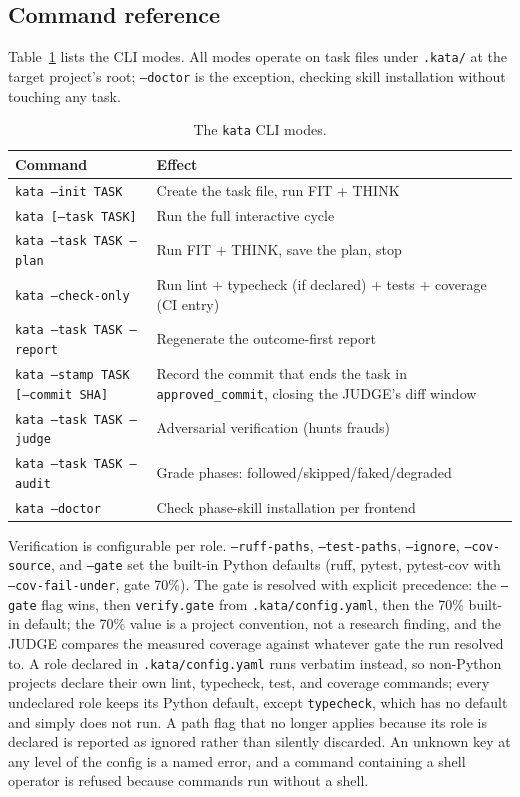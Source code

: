 \documentclass{sbc2019}%
\begin{document}
\subsection{Command reference}

Table~\ref{tab:cli} lists the CLI modes. All modes operate on task files
under \texttt{.kata/} at the target project's root; \texttt{--doctor} is
the exception, checking skill installation without touching any task.

\begin{table}[!ht]
\caption{The \texttt{kata} CLI modes.}
\centering
\begin{tabular}{@{}ll@{}}
\hline\hline
Command & Effect \\
\hline
\texttt{kata --init TASK} & Create the task file, run FIT + THINK \\
\texttt{kata [--task TASK]} & Run the full interactive cycle \\
\texttt{kata --task TASK --plan} & Run FIT + THINK, save the plan, stop \\
\texttt{kata --check-only} & Run lint + typecheck (if declared) + tests + coverage (CI entry) \\
\texttt{kata --task TASK --report} & Regenerate the outcome-first report \\
\texttt{kata --stamp TASK [--commit SHA]} & Record the commit that ends the task in \texttt{approved\_commit}, closing the JUDGE's diff window \\
\texttt{kata --task TASK --judge} & Adversarial verification (hunts frauds) \\
\texttt{kata --task TASK --audit} & Grade phases: followed/skipped/faked/degraded \\
\texttt{kata --doctor} & Check phase-skill installation per frontend \\
\hline\hline
\end{tabular}
\label{tab:cli}
\end{table}

Verification is configurable per role. \texttt{--ruff-paths},
\texttt{--test-paths}, \texttt{--ignore}, \texttt{--cov-source}, and
\texttt{--gate} set the built-in Python defaults (ruff, pytest, pytest-cov
with \texttt{--cov-fail-under}, gate 70\%). The gate is resolved with
explicit precedence: the \texttt{--gate} flag wins, then
\texttt{verify.gate} from \texttt{.kata/config.yaml}, then the 70\%
built-in default; the 70\% value is a project convention, not a research
finding, and the JUDGE compares the measured coverage against whatever
gate the run resolved to. A role declared in
\texttt{.kata/config.yaml} runs verbatim instead, so non-Python projects
declare their own lint, typecheck, test, and coverage commands; every
undeclared role keeps its Python default, except \texttt{typecheck}, which
has no default and simply does not run. A path flag that no longer applies
because its role is declared is reported as ignored rather than silently
discarded. An unknown key at any level of the config is a named error, and
a command containing a shell operator is refused because commands run
without a shell.
\end{document}
